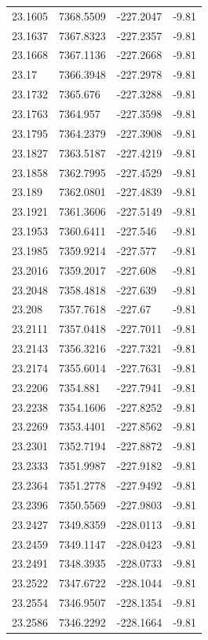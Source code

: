 \begin{table}[H]
\begin{tabular}{llll}
23.1605 & 7368.5509 & -227.2047 & -9.81 \\
23.1637 & 7367.8323 & -227.2357 & -9.81 \\
23.1668 & 7367.1136 & -227.2668 & -9.81 \\
23.17 & 7366.3948 & -227.2978 & -9.81 \\
23.1732 & 7365.676 & -227.3288 & -9.81 \\
23.1763 & 7364.957 & -227.3598 & -9.81 \\
23.1795 & 7364.2379 & -227.3908 & -9.81 \\
23.1827 & 7363.5187 & -227.4219 & -9.81 \\
23.1858 & 7362.7995 & -227.4529 & -9.81 \\
23.189 & 7362.0801 & -227.4839 & -9.81 \\
23.1921 & 7361.3606 & -227.5149 & -9.81 \\
23.1953 & 7360.6411 & -227.546 & -9.81 \\
23.1985 & 7359.9214 & -227.577 & -9.81 \\
23.2016 & 7359.2017 & -227.608 & -9.81 \\
23.2048 & 7358.4818 & -227.639 & -9.81 \\
23.208 & 7357.7618 & -227.67 & -9.81 \\
23.2111 & 7357.0418 & -227.7011 & -9.81 \\
23.2143 & 7356.3216 & -227.7321 & -9.81 \\
23.2174 & 7355.6014 & -227.7631 & -9.81 \\
23.2206 & 7354.881 & -227.7941 & -9.81 \\
23.2238 & 7354.1606 & -227.8252 & -9.81 \\
23.2269 & 7353.4401 & -227.8562 & -9.81 \\
23.2301 & 7352.7194 & -227.8872 & -9.81 \\
23.2333 & 7351.9987 & -227.9182 & -9.81 \\
23.2364 & 7351.2778 & -227.9492 & -9.81 \\
23.2396 & 7350.5569 & -227.9803 & -9.81 \\
23.2427 & 7349.8359 & -228.0113 & -9.81 \\
23.2459 & 7349.1147 & -228.0423 & -9.81 \\
23.2491 & 7348.3935 & -228.0733 & -9.81 \\
23.2522 & 7347.6722 & -228.1044 & -9.81 \\
23.2554 & 7346.9507 & -228.1354 & -9.81 \\
23.2586 & 7346.2292 & -228.1664 & -9.81 \\

\end{tabular}
\end{table}

